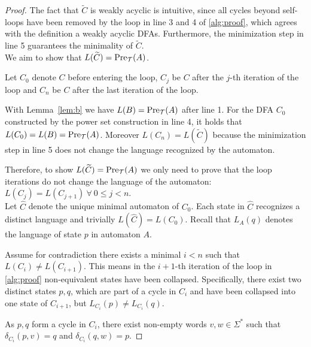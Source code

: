 \begin{proof}
The fact that $\widetilde{C}$ is weakly acyclic is intuitive, since all cycles beyond self-loops have been removed by the loop in line 3 and 4 of \autoref{alg:proof}, which agrees with the definition a weakly acyclic DFAs. Furthermore, the minimization step in line 5 guarantees the minimality of $\widetilde{C}$.
\\ 

We aim to show that $L(\widetilde{C}) = \operatorname{\text{Pre}}_{\mathcal{T}}(A)$.

Let $C_{0}$ denote $C$ before entering the loop, $C_{j}$ be $C$ after the $j$-th iteration of the loop and $C_{n}$ be $C$ after the last iteration of the loop.

With Lemma~\ref{lem:b} we have $L(B) = \operatorname{\text{Pre}}_{\mathcal{T}}(A)$ after line 1. For the DFA $C_{0}$ constructed by the power set construction in line 4, it holds that $L(C_{0}) = L(B) = \operatorname{\text{Pre}}_{\mathcal{T}}(A)$. Moreover $L(C_{n}) = L(\widetilde{C})$ because the minimization step in line 5 does not change the language recognized by the automaton.

Therefore, to show $L(\widetilde{C}) = \operatorname{\text{Pre}}_{\mathcal{T}}(A)$ we only need to prove that the loop iterations do not change the language of the automaton: $L(C_{j}) = L(C_{j+1}) \ \forall \ 0 \le j < n$. \\


Let $\widehat{C}$ denote the unique minimal automaton of $C_{0}$. Each state in $\widehat{C}$ recognizes a distinct language and trivially $L(\widehat{C}) = L(C_{0})$. Recall that $L_{A}(q)$ denotes the language of state $p$ in automaton $A$. 

Assume for contradiction there exists a minimal $i<n$ such that  $L(C_{i}) \neq L(C_{i+1})$. This means in the $i+1$-th iteration of the loop in \autoref{alg:proof} non-equivalent states have been collapsed.
Specifically, there exist two distinct states $p,q$, which are part of a cycle in $C_{i}$ and have been collapsed into one state of $C_{i+1}$, but $L_{C_{i}}(p) \neq L_{C_{i}}(q)$.

As $p,q$ form a cycle in $C_{i}$, there exist non-empty words $v,w \in \Sigma^{*}$ such that $\delta_{C_{i}}(p,v) = q$ and $\delta_{C_{i}}(q,w) = p$. 


\end{proof}
